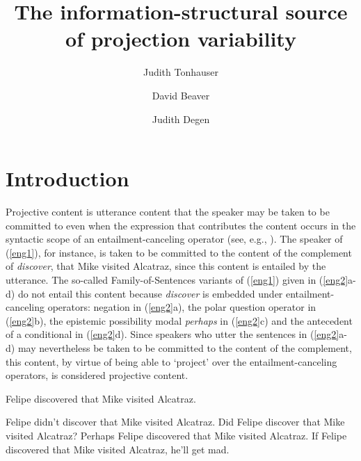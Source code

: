 \documentclass[11pt,fleqn]{article}
\title{The information-structural source of projection variability}
\author[$\bullet$]{Judith Tonhauser}
\author[$\circ$]{David Beaver}
\author[$\triangleright$]{Judith Degen}
\affil[$\bullet$]{The Ohio State University}
\affil[$\circ$]{University of Texas at Austin}
\affil[$\triangleright$]{Stanford University}
\newcommand{\6}{\mbox{$[\hspace*{-.6mm}[$}}
\newcommand{\9}{\mbox{$]\hspace*{-.6mm}]$}}
\begin{document}
\maketitle

\begin{abstract}

\end{abstract}


			
\section{Introduction}

Projective content is utterance content that the speaker may be taken to be committed to even when the expression that contributes the content occurs in the syntactic scope of an entailment-canceling operator (see, e.g., \citealt{ccmg90}). The speaker of (\ref{eng1}), for instance, is taken to be committed to the content of the complement of {\em discover}, that Mike visited Alcatraz, since this content is entailed by the utterance. The so-called Family-of-Sentences variants of (\ref{eng1}) given in (\ref{eng2}a-d) do not entail this content because {\em discover} is embedded under entailment-canceling operators: negation in (\ref{eng2}a), the polar question operator in (\ref{eng2}b), the epistemic possibility modal {\em perhaps} in (\ref{eng2}c) and the antecedent of a conditional in (\ref{eng2}d). Since speakers who utter the sentences in (\ref{eng2}a-d) may nevertheless be taken to be committed to the content of the complement, this content, by virtue of being able to `project' over the entailment-canceling operators, is considered projective content. 

\begin{exe}
\ex\label{eng1}  Felipe discovered that Mike visited Alcatraz.

\ex\label{eng2}
\begin{xlist} 
\ex Felipe didn't discover that Mike visited Alcatraz.
\ex Did Felipe discover that Mike visited Alcatraz?
\ex Perhaps Felipe discovered that Mike visited Alcatraz.
\ex If Felipe discovered that Mike visited Alcatraz, he'll get mad.
\end{xlist}
\end{exe}
\end{document}
